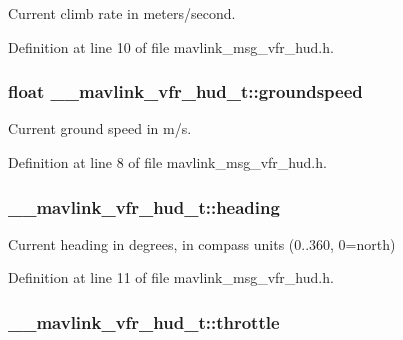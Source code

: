 Current climb rate in meters/second. 



Definition at line 10 of file mavlink\-\_\-msg\-\_\-vfr\-\_\-hud.\-h.

\hypertarget{struct____mavlink__vfr__hud__t_aecadd708f2c0aee3193f00bd22711730}{
\subsubsection[{groundspeed}]{\setlength{\rightskip}{0pt plus 5cm}float \-\_\-\-\_\-mavlink\-\_\-vfr\-\_\-hud\-\_\-t\-::groundspeed}}\label{struct____mavlink__vfr__hud__t_aecadd708f2c0aee3193f00bd22711730}


Current ground speed in m/s. 



Definition at line 8 of file mavlink\-\_\-msg\-\_\-vfr\-\_\-hud.\-h.

\hypertarget{struct____mavlink__vfr__hud__t_a54e333ab2f24a5340e8bd5cbfa91db15}{
\subsubsection[{heading}]{ \-\_\-\-\_\-mavlink\-\_\-vfr\-\_\-hud\-\_\-t\-::heading}}\label{struct____mavlink__vfr__hud__t_a54e333ab2f24a5340e8bd5cbfa91db15}


Current heading in degrees, in compass units (0..360, 0=north) 



Definition at line 11 of file mavlink\-\_\-msg\-\_\-vfr\-\_\-hud.\-h.

\hypertarget{struct____mavlink__vfr__hud__t_ae73bae71b52e32eb61edb4fbccac319c}{
\subsubsection[{throttle}]{ \-\_\-\-\_\-mavlink\-\_\-vfr\-\_\-hud\-\_\-t\-::throttle}}\label{struct____mavlink__vfr__hud__t_ae73bae71b52e32eb61edb4fbccac319c}


